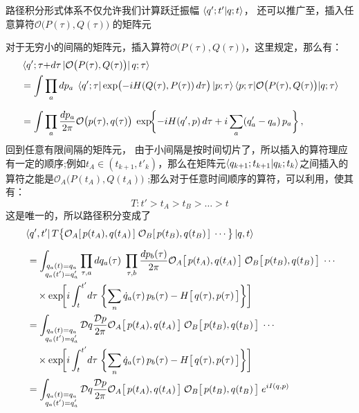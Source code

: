 路径积分形式体系不仅允许我们计算跃迁振幅
$\braket{q';t'|q;t}$，
还可以推广至，插入任意算符$\mathcal{O}\bigl(P(\tau),Q(\tau)\bigr)$
的矩阵元

\medskip\noindent
对于无穷小的间隔的矩阵元，插入算符$\mathcal{O}\bigl(P(\tau),Q(\tau)\bigr)$，这里规定，那么有：
\begin{align}
  &\braket{q';\tau{+}d\tau\,|\mathcal{O}\bigl(P(\tau),Q(\tau)\bigr)|\,q;\tau}\\
  &= \int\prod_a dp_a\;
    \bra{q';\tau}\exp\bigl(-iH(Q(\tau),P(\tau))\,d\tau\bigr)
    \ket{p;\tau}\braket{p;\tau|\mathcal{O}\bigl(P(\tau),Q(\tau)\bigr)|q;\tau}
    \notag\\[6pt]
  &= \int\prod_a\frac{dp_a}{2\pi}\mathcal{O}\bigl(p(\tau),q(\tau)\bigr)\;
    \exp\!\biggl\{
      -iH(q',p)\,d\tau
      +i\sum_a(q'_a-q_a)\,p_a
    \biggr\}\,,
    \label{eq:single-step}
\end{align}
回到任意有限间隔的矩阵元，\color{blue} 由于小间隔是按时间切片了，所以插入的算符理应有一定的顺序;例如$t_A\in (t_{k+1},t'_k)$，那么在矩阵元$\braket{q_{k+1};t_{k+1}|q_k;t_k}$之间插入的算符之能是$\mathcal{O}_A \bigl(P(t_A),Q(t_A)\bigr)$ \normalcolor;那么对于任意时间顺序的算符，可以利用，使其有：
\[T:t'>t_A>t_B>\dots>t\]
这是唯一的，所以路径积分变成了
\begin{equation}\label{eq:PI-field}
\begin{aligned}
  &\bra{q',t'}T\bigl\{
    \mathcal{O}_A[\,p(t_A),q(t_A)\,]\;
    \mathcal{O}_B[\,p(t_B),q(t_B)\,]\;\cdots
  \bigr\}\ket{q,t}\\[6pt]
  &\;=\int_{\substack{q_a(t)=q_a\\q_a(t')=q'_a}}
    \prod_{\tau,a}dq_a(\tau)\;
    \prod_{\tau,b}
      \frac{dp_b(\tau)}{2\pi}
    \mathcal{O}_A\bigl[\,p(t_A),q(t_A)\,\bigr]\;
    \mathcal{O}_B\bigl[\,p(t_B),q(t_B)\,\bigr]\;\cdots\\
  &\;\quad\times
    \exp\!\biggl[
      i\int_{t}^{t'}\!d\tau\;\biggl\{
        \sum_n\dot{q}_a(\tau)\,
          p_b(\tau)
        -H\bigl[\,q(\tau),p(\tau)\,\bigr]
      \biggr\}
    \biggr]\\
    &\;=\int_{\substack{q_a(t)=q_a\\q_a(t')=q'_a}}
    \mathcal{D}q\frac{\mathcal{D}p}{2\pi}
    \mathcal{O}_A\bigl[\,p(t_A),q(t_A)\,\bigr]\;
    \mathcal{O}_B\bigl[\,p(t_B),q(t_B)\,\bigr]\;\cdots\\
  &\;\quad\times
    \exp\!\biggl[
      i\int_{t}^{t'}\!d\tau\;\biggl\{
        \sum_n\dot{q}_a(\tau)\,
          p_b(\tau)
        -H\bigl[\,q(\tau),p(\tau)\,\bigr]
      \biggr\}
    \biggr]\\
    &\;=\int_{\substack{q_a(t)=q_a\\q_a(t')=q'_a}}
    \mathcal{D}q\frac{\mathcal{D}p}{2\pi}
    \mathcal{O}_A\bigl[\,p(t_A),q(t_A)\,\bigr]\;
    \mathcal{O}_B\bigl[\,p(t_B),q(t_B)\,\bigr]\;e^{iI(q,p)}
\end{aligned}
\end{equation}

